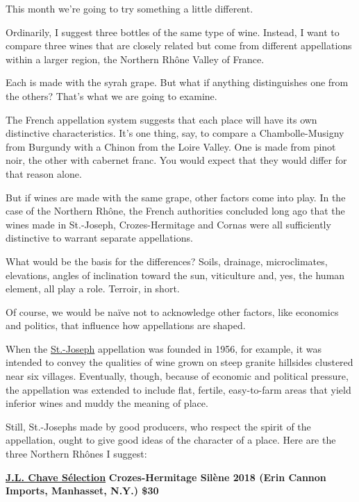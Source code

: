 This month we're going to try something a little different.

Ordinarily, I suggest three bottles of the same type of wine. Instead, I
want to compare three wines that are closely related but come from
different appellations within a larger region, the Northern Rhône Valley
of France.

Each is made with the syrah grape. But what if anything distinguishes
one from the others? That's what we are going to examine.

The French appellation system suggests that each place will have its own
distinctive characteristics. It's one thing, say, to compare a
Chambolle-Musigny from Burgundy with a Chinon from the Loire Valley. One
is made from pinot noir, the other with cabernet franc. You would expect
that they would differ for that reason alone.

But if wines are made with the same grape, other factors come into play.
In the case of the Northern Rhône, the French authorities concluded long
ago that the wines made in St.-Joseph, Crozes-Hermitage and Cornas were
all sufficiently distinctive to warrant separate appellations.

What would be the basis for the differences? Soils, drainage,
microclimates, elevations, angles of inclination toward the sun,
viticulture and, yes, the human element, all play a role. Terroir, in
short.

Of course, we would be naïve not to acknowledge other factors, like
economics and politics, that influence how appellations are shaped.

When the
\href{https://www.nytimes3xbfgragh.onion/2013/07/17/dining/reclaiming-the-earthy-grapes-of-st-joseph.html}{St.-Joseph}
appellation was founded in 1956, for example, it was intended to convey
the qualities of wine grown on steep granite hillsides clustered near
six villages. Eventually, though, because of economic and political
pressure, the appellation was extended to include flat, fertile,
easy-to-farm areas that yield inferior wines and muddy the meaning of
place.

Still, St.-Josephs made by good producers, who respect the spirit of the
appellation, ought to give good ideas of the character of a place. Here
are the three Northern Rhônes I suggest:

\href{http://grandcruselections.com/jean-louis-chave-selections}{\textbf{J.L.
Chave Sélection}} \textbf{Crozes-Hermitage Silène 2018 (Erin Cannon
Imports, Manhasset, N.Y.) \$30}


